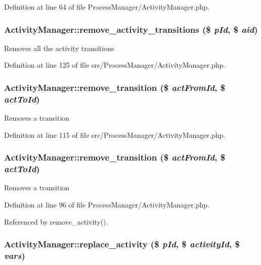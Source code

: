 Definition at line 64 of file Process\-Manager/Activity\-Manager.php.
\subsubsection{\setlength{\rightskip}{0pt plus 5cm}Activity\-Manager::remove\_\-activity\_\-transitions (\$ {\em p\-Id}, \$ {\em aid})}\label{classActivityManager_a24}


Removes all the activity transitions 

Definition at line 125 of file src/Process\-Manager/Activity\-Manager.php.
\subsubsection{\setlength{\rightskip}{0pt plus 5cm}Activity\-Manager::remove\_\-transition (\$ {\em act\-From\-Id}, \$ {\em act\-To\-Id})}\label{classActivityManager_a23}


Removes a transition 

Definition at line 115 of file src/Process\-Manager/Activity\-Manager.php.
\subsubsection{\setlength{\rightskip}{0pt plus 5cm}Activity\-Manager::remove\_\-transition (\$ {\em act\-From\-Id}, \$ {\em act\-To\-Id})}\label{classActivityManager_a6}


Removes a transition 

Definition at line 96 of file Process\-Manager/Activity\-Manager.php.

Referenced by remove\_\-activity().
\subsubsection{\setlength{\rightskip}{0pt plus 5cm}Activity\-Manager::replace\_\-activity (\$ {\em p\-Id}, \$ {\em activity\-Id}, \$ {\em vars})}\label{classActivityManager_a34}


